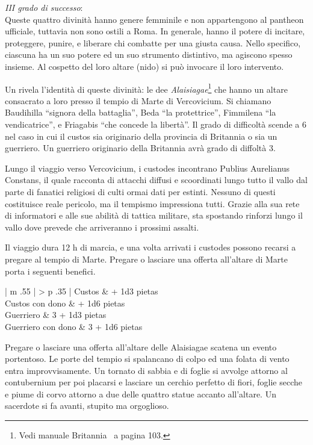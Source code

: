 \documentclass[11.5pt,twocolumn]{article}
\begin{document}
\emph{III grado di successo}:\\
Queste quattro divinit\`{a} hanno genere femminile e non appartengono al pantheon ufficiale, tuttavia non sono ostili a Roma.
In generale, hanno il potere di incitare, proteggere, punire, e liberare chi combatte per una giusta causa.
Nello specifico, ciascuna ha un suo potere ed un suo strumento distintivo, ma agiscono spesso insieme.
Al cospetto del loro altare (nido) si pu\`{o} invocare il loro intervento.

Un  rivela l'identit\`{a} di queste divinit\`{a}: le dee \emph{Alaisiagae}\footnote{Vedi manuale Britannia~\cite{britannia_en} a pagina 103.} che hanno un altare consacrato a loro presso il tempio di Marte di Vercovicium.
Si chiamano Baudihilla ``signora della battaglia'', Beda ``la protettrice'', Fimmilena ``la vendicatrice'', e Friagabis ``che concede la libert\`{a}''.
Il grado di difficolt\`{a} scende a 6 nel caso in cui il custos sia originario della provincia di Britannia o sia un guerriero.
Un guerriero originario della Britannia avr\`{a} grado di diffolt\`{a} 3.

Lungo il viaggio verso Vercovicium, i custodes incontrano Publius Aurelianus Constans, il quale racconta di attacchi diffusi e scoordinati lungo tutto il vallo dal parte di fanatici religiosi di culti ormai dati per estinti.
Nessuno di questi costituisce reale pericolo, ma il tempismo impressiona tutti.
Grazie alla sua rete di informatori e alle sue abilit\`{a} di tattica militare, sta spostando rinforzi lungo il vallo dove prevede che arriveranno i prossimi assalti.

Il viaggio dura 12 h di marcia, e una volta arrivati i custodes possono recarsi a pregare al tempio di Marte.
Pregare o lasciare una offerta all'altare di Marte porta i seguenti benefici.
\begin{table}[h]
\begin{tabular}{| m {.55\columnwidth} | >{\raggedleft\arraybackslash} p {.35\columnwidth} | }
\hline
Custos	 		&	+ 1d3 pietas \\
\hline
Custos con dono 	&	+ 1d6 pietas \\
\hline
Guerriero 		&	3 + 1d3 pietas \\
\hline
Guerriero con dono	&	3 + 1d6 pietas \\
\hline
\end{tabular}
\end{table}

Pregare o lasciare una offerta all'altare delle Alaisiagae scatena un evento portentoso.
Le porte del tempio si spalancano di colpo ed una folata di vento entra improvvisamente.
Un tornato di sabbia e di foglie si avvolge attorno al contubernium per poi placarsi e lasciare un cerchio perfetto di fiori, foglie secche e piume di corvo attorno a due delle quattro statue accanto all'altare.
Un sacerdote si fa avanti, stupito ma orgoglioso.
\end{document}
